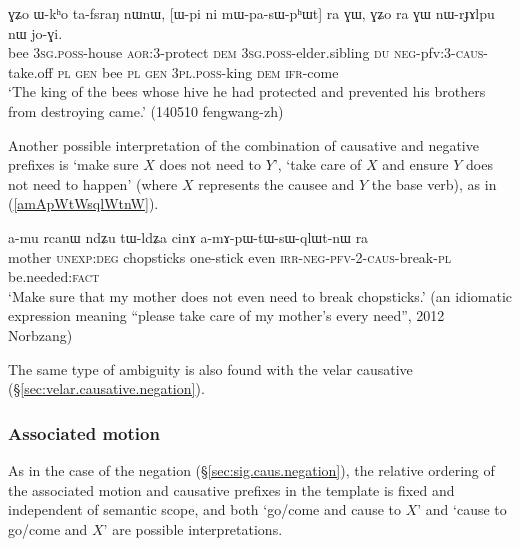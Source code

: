 \begin{exe}
\ex \label{ex:mWpasWphWt}
\gll ɣʑo ɯ-kʰo ta-fsraŋ nɯnɯ, [ɯ-pi ni mɯ-pa-sɯ-pʰɯt] ra ɣɯ, ɣʑo ra ɣɯ nɯ-rɟɤlpu nɯ jo-ɣi. \\
bee \textsc{3sg}.\textsc{poss}-house \textsc{aor}:3\flobv{}-protect \textsc{dem} \textsc{3sg}.\textsc{poss}-elder.sibling \textsc{du} \textsc{neg}-pfv:3\flobv{}-\textsc{caus}-take.off \textsc{pl} \textsc{gen} bee \textsc{pl} \textsc{gen} \textsc{3pl}.\textsc{poss}-king \textsc{dem} \textsc{ifr}-come \\
\glt `The king of the bees whose hive he had protected and  prevented his brothers from destroying came.' (140510 fengwang-zh)
\end{exe}


Another possible interpretation of the combination of causative and negative prefixes is `make sure $X$ does not need to $Y$', `take care of $X$ and ensure $Y$ does not need to happen' (where $X$ represents the causee and $Y$ the base verb), as in (\ref{amApWtWsqlWtnW}).

\begin{exe}
\ex \label{amApWtWsqlWtnW}
\gll   a-mu rcanɯ ndʑu tɯ-ldʑa cinɤ  a-mɤ-pɯ-tɯ-sɯ-qlɯt-nɯ ra \\
 mother \textsc{unexp}:\textsc{deg} chopsticks one-stick even  \textsc{irr}-\textsc{neg}-\textsc{pfv}-2-\textsc{caus}-break-\textsc{pl} be.needed:\textsc{fact} \\
 \glt   `Make sure that my mother does not even need to break chopsticks.' (an idiomatic expression meaning ``please take care of my mother's every need'', 2012 Norbzang)
\end{exe}

The same type of ambiguity is also found with the velar causative (§\ref{sec:velar.causative.negation}).

\subsubsection{Associated motion} \label{sec:sig.caus.AM} 
 
As in the case of the negation (§\ref{sec:sig.caus.negation}), the relative ordering of the associated motion and causative prefixes in the template is fixed and independent of semantic scope, and both  `go/come and cause to $X$' and `cause to go/come and $X$' are possible interpretations.

